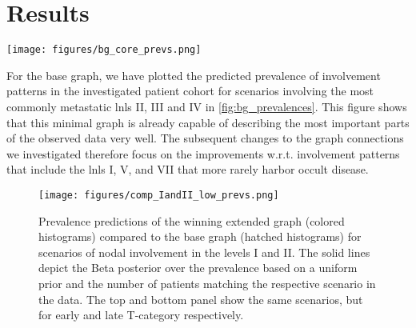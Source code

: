 \documentclass[twocolumn]{aastex631}
\begin{document}
\section{Results}
\label{sec:results}

\begin{figure*}
    \begin{centering}
        \texttt{[image: figures/bg\_core\_prevs.png]}
        \caption{Prevalence of involvement as predicted by the base graph model for different scenarios involving the most commonly metastatic \glspl{lnl} II, III and IV (shaded histograms). The model's predictions are compared to Beta posteriors over the prevalence based on the frequency of the same scenarios and a uniform prior (slid lines). The top panel shows some selected scenarios with early T-category tumors and the bottom panel with late T-category.}
        \label{fig:bg_prevalences}
    \end{centering}
\end{figure*}

For the base graph, we have plotted the predicted prevalence of involvement patterns in the investigated patient cohort for scenarios involving the most commonly metastatic \glspl{lnl} II, III and IV in \cref{fig:bg_prevalences}. This figure shows that this minimal graph is already capable of describing the most important parts of the observed data very well. The subsequent changes to the graph connections we investigated therefore focus on the improvements w.r.t. involvement patterns that include the \glspl{lnl} I, V, and VII that more rarely harbor occult disease.

\begin{figure}
    \begin{centering}
        \texttt{[image: figures/comp\_IandII\_low\_prevs.png]}
        \caption{Prevalence predictions of the winning extended graph (colored histograms) compared to the base graph (hatched histograms) for scenarios of nodal involvement in the levels I and II. The solid lines depict the Beta posterior over the prevalence based on a uniform prior and the number of patients matching the respective scenario in the data. The top and bottom panel show the same scenarios, but for early and late T-category respectively.}
        \label{fig:IandII_low_prevs}
    \end{centering}
\end{figure}
\end{document}
